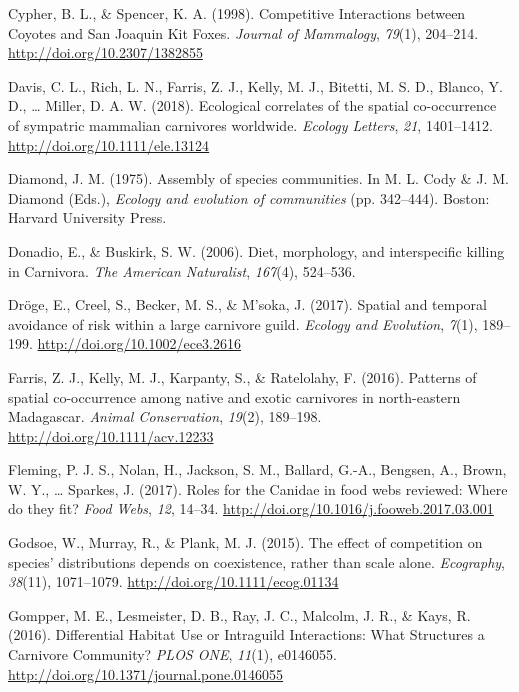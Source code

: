 \documentclass[12pt,twoside]{reedthesis}
\begin{document}
\leavevmode\hypertarget{ref-cypher_competitive_1998}{}%
Cypher, B. L., \& Spencer, K. A. (1998). Competitive Interactions between Coyotes and San Joaquin Kit Foxes. \emph{Journal of Mammalogy}, \emph{79}(1), 204--214. \url{http://doi.org/10.2307/1382855}

\leavevmode\hypertarget{ref-davis_ecological_2018}{}%
Davis, C. L., Rich, L. N., Farris, Z. J., Kelly, M. J., Bitetti, M. S. D., Blanco, Y. D., \ldots{} Miller, D. A. W. (2018). Ecological correlates of the spatial co-occurrence of sympatric mammalian carnivores worldwide. \emph{Ecology Letters}, \emph{21}, 1401--1412. \url{http://doi.org/10.1111/ele.13124}

\leavevmode\hypertarget{ref-diamond_assembly_1975}{}%
Diamond, J. M. (1975). Assembly of species communities. In M. L. Cody \& J. M. Diamond (Eds.), \emph{Ecology and evolution of communities} (pp. 342--444). Boston: Harvard University Press.

\leavevmode\hypertarget{ref-donadio_diet_2006}{}%
Donadio, E., \& Buskirk, S. W. (2006). Diet, morphology, and interspecific killing in Carnivora. \emph{The American Naturalist}, \emph{167}(4), 524--536.

\leavevmode\hypertarget{ref-droge_spatial_2017}{}%
Dröge, E., Creel, S., Becker, M. S., \& M'soka, J. (2017). Spatial and temporal avoidance of risk within a large carnivore guild. \emph{Ecology and Evolution}, \emph{7}(1), 189--199. \url{http://doi.org/10.1002/ece3.2616}

\leavevmode\hypertarget{ref-farris_patterns_2016}{}%
Farris, Z. J., Kelly, M. J., Karpanty, S., \& Ratelolahy, F. (2016). Patterns of spatial co-occurrence among native and exotic carnivores in north-eastern Madagascar. \emph{Animal Conservation}, \emph{19}(2), 189--198. \url{http://doi.org/10.1111/acv.12233}

\leavevmode\hypertarget{ref-fleming_roles_2017}{}%
Fleming, P. J. S., Nolan, H., Jackson, S. M., Ballard, G.-A., Bengsen, A., Brown, W. Y., \ldots{} Sparkes, J. (2017). Roles for the Canidae in food webs reviewed: Where do they fit? \emph{Food Webs}, \emph{12}, 14--34. \url{http://doi.org/10.1016/j.fooweb.2017.03.001}

\leavevmode\hypertarget{ref-godsoe_effect_2015}{}%
Godsoe, W., Murray, R., \& Plank, M. J. (2015). The effect of competition on species' distributions depends on coexistence, rather than scale alone. \emph{Ecography}, \emph{38}(11), 1071--1079. \url{http://doi.org/10.1111/ecog.01134}

\leavevmode\hypertarget{ref-gompper_differential_2016}{}%
Gompper, M. E., Lesmeister, D. B., Ray, J. C., Malcolm, J. R., \& Kays, R. (2016). Differential Habitat Use or Intraguild Interactions: What Structures a Carnivore Community? \emph{PLOS ONE}, \emph{11}(1), e0146055. \url{http://doi.org/10.1371/journal.pone.0146055}
\end{document}
